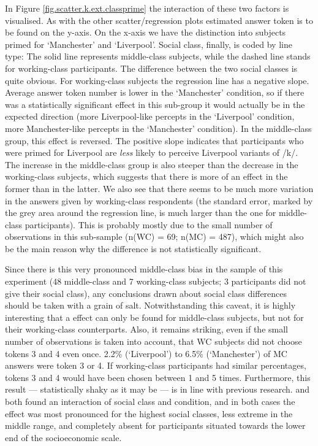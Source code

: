 In Figure \ref{fig.scatter.k.ext.classprime} the interaction of these two factors is visualised.
As with the other scatter/regression plots estimated answer token is to be found on the y-axis.
On the x-axis we have the distinction into subjects primed for `Manchester' and `Liverpool'.
Social class, finally, is coded by line type: The solid line represents middle-class subjects, while the dashed line stands for working-class participants.
The difference between the two social classes is quite obvious.
For working-class subjects the regression line has a negative slope.
Average answer token number is lower in the `Manchester' condition, so if there was a statistically significant  effect in this sub-group it would actually be in the expected direction (more Liverpool-like percepts in the `Liverpool' condition, more Manchester-like percepts in the `Manchester' condition).
In the middle-class group, this effect is reversed.
The positive slope indicates that participants who were primed for Liverpool are \emph{less} likely to perceive Liverpool variants of /k/.
The increase in the middle-class group is also steeper than the decrease in the working-class subjects, which suggests that there is more of an effect in the former than in the latter.
We also see that there seems to be much more variation in the answers given by working-class respondents (the standard error, marked by the grey area around the regression line, is much larger than the one for middle-class participants).
This is probably mostly due to the small number of observations in this sub-sample (n(WC) = 69; n(MC) = 487), which might also be the main reason why the difference is not statistically significant.

Since there is this very pronounced middle-class bias in the sample of this experiment (48 middle-class and 7 working-class subjects; 3 participants did not give their social class), any conclusions drawn about social class differences should be taken with a grain of salt.
Notwithstanding this caveat, it is highly interesting that a  effect can only be found for middle-class subjects, but not for their working-class counterparts.
Also, it remains striking, even if the small number of observations is taken into account, that WC subjects did not choose tokens 3 and 4 even once.
2.2\% (`Liverpool') to 6.5\% (`Manchester') of MC answers were token 3 or 4.
If working-class participants had similar percentages, tokens 3 and 4 would have been chosen between 1 and 5 times.
Furthermore, this result --- statistically shaky as it may be --- is in line with previous research.
\textcite{hayetal2006a} and \textcite{haydrager2010} both found an interaction of social class and condition, and in both cases the  effect was most pronounced for the highest social classes, less extreme in the middle range, and completely absent for participants situated towards the lower end of the socioeconomic scale.

